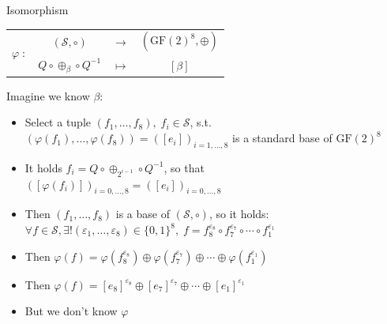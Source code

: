 \documentclass{beamer}
\newcommand{\gf}{\ensuremath{\text{GF}\left(2\right)}}
\begin{document}
\begin{frame}
    \begin{block}{Isomorphism}
	\begin{center}
	\begin{tabular}{ r  c c c }
	    \multirow{2}{*}{$\varphi \; :$} & $(\mathcal{S}, \circ )$  & $\longrightarrow$ & $(\gf^8, \oplus)$ \\
					    & $Q \circ \oplus_{\beta} \circ Q^{-1} $ & $\longmapsto$ & $\left[ \beta \right]$
	\end{tabular}
	\end{center}
    \end{block}
    \medskip

    Imagine we know $\beta$: \pause
    \begin{itemize}
     \item Select a tuple $(f_1, \dots ,f_8),\; f_i \in \mathcal{S}$, s.t. $(\varphi(f_1), \dots , \varphi(f_8)) = ([e_i])_{i=1,\dots,8}$ is a standard base of $\gf^8$ \pause
     \item It holds $f_i = Q \circ \oplus_{2^{i-1}} \circ Q^{-1}$, so that $([\varphi(f_i)])_{i=0,\dots,8} = ([e_i])_{i=0,\dots,8} $ \pause
      
     \item Then $(f_1, \dots ,f_8)$ is a base of $(\mathcal{S}, \circ)$, so it holds: \\ 
	    $\forall f \in \mathcal{S}, \exists ! (\varepsilon_1, \dots, \varepsilon_8) \in \{0,1\}^8, \; f = f_8^{\varepsilon_8} \circ f_7^{\varepsilon_7} \circ \cdots \circ f_1^{\varepsilon_1}$  \pause
     \item Then $\varphi(f) = \varphi(f_8^{\varepsilon_8}) \oplus \varphi(f_7^{\varepsilon_7}) \oplus \cdots \oplus \varphi(f_1^{\varepsilon_1})$ \pause
     \item Then $\varphi(f) = [e_8]^{\varepsilon_8} \oplus [e_7]^{\varepsilon_7} \oplus \cdots \oplus [e_1]^{\varepsilon_1}$ \pause
     
     \item But we don't know $\varphi$
     \end{itemize}
\end{frame}
\end{document}
